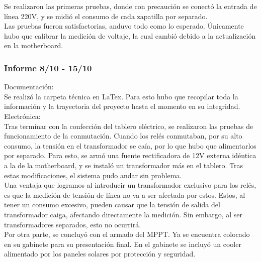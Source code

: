 Se realizaron las primeras pruebas, donde con precaución se conectó la entrada de línea 220V, y se midió el consumo de cada zapatilla por separado. \\
Las pruebas fueron satisfactorias, anduvo todo como lo esperado. Únicamente hubo que calibrar la medición de voltaje, la cual cambió debido a la actualización en la motherboard.\\

\subsubsection{Informe 8/10 - 15/10}

Documentación: \\

Se realizó la carpeta técnica en LaTex. Para esto hubo que recopilar toda la información y la trayectoria del proyecto hasta el momento en su integridad.\\

Electrónica: \\

Tras terminar con la confección del tablero eléctrico, se realizaron las pruebas de funcionamiento de la conmutación. Cuando los relés conmutaban, por su alto consumo, la tensión en el transformador se caía, por lo que hubo que alimentarlos por separado. Para esto, se armó una fuente rectificadora de 12V externa idéntica a la de la motherboard, y se instaló un transformador más en el tablero. Tras estas modificaciones, el sistema pudo andar sin problema.\\

Una ventaja que logramos al introducir un transformador exclusivo para los relés, es que la medición de tensión de línea no va a ser afectada por estos. Estos, al tener un consumo excesivo, pueden causar que la tensión de salida del transformador caiga, afectando directamente la medición. Sin embargo, al ser transformadores separados, esto no ocurrirá.\\

Por otra parte, se concluyó con el armado del MPPT. Ya se encuentra colocado en su gabinete para su presentación final. En el gabinete se incluyó un cooler alimentado por los paneles solares por protección y seguridad.\\

